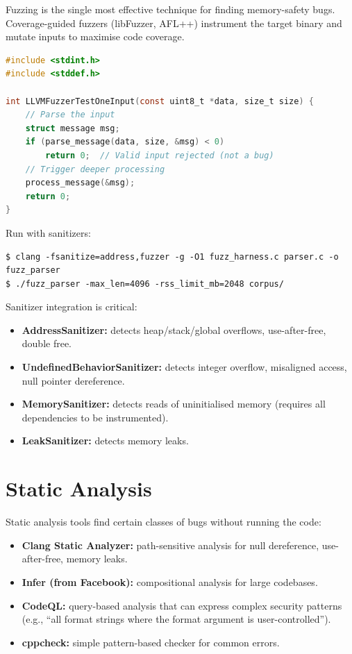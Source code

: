 Fuzzing is the single most effective technique for finding memory-safety bugs. Coverage-guided fuzzers (libFuzzer, AFL++) instrument the target binary and mutate inputs to maximise code coverage.

\begin{lstlisting}[language=C, caption=libFuzzer harness for a parser]
#include <stdint.h>
#include <stddef.h>

int LLVMFuzzerTestOneInput(const uint8_t *data, size_t size) {
    // Parse the input
    struct message msg;
    if (parse_message(data, size, &msg) < 0)
        return 0;  // Valid input rejected (not a bug)
    // Trigger deeper processing
    process_message(&msg);
    return 0;
}
\end{lstlisting}

Run with sanitizers:

\begin{lstlisting}[caption=Running the fuzzer with sanitizers]
$ clang -fsanitize=address,fuzzer -g -O1 fuzz_harness.c parser.c -o fuzz_parser
$ ./fuzz_parser -max_len=4096 -rss_limit_mb=2048 corpus/
\end{lstlisting}

Sanitizer integration is critical:
\begin{itemize}
	\item \textbf{AddressSanitizer:} detects heap/stack/global overflows, use-after-free, double free.
	\item \textbf{UndefinedBehaviorSanitizer:} detects integer overflow, misaligned access, null pointer dereference.
	\item \textbf{MemorySanitizer:} detects reads of uninitialised memory (requires all dependencies to be instrumented).
	\item \textbf{LeakSanitizer:} detects memory leaks.
\end{itemize}

\section{Static Analysis}

Static analysis tools find certain classes of bugs without running the code:

\begin{itemize}
	\item \textbf{Clang Static Analyzer:} path-sensitive analysis for null dereference, use-after-free, memory leaks.
	\item \textbf{Infer (from Facebook):} compositional analysis for large codebases.
	\item \textbf{CodeQL:} query-based analysis that can express complex security patterns (e.g., ``all format strings where the format argument is user-controlled'').
	\item \textbf{cppcheck:} simple pattern-based checker for common errors.
\end{itemize}


